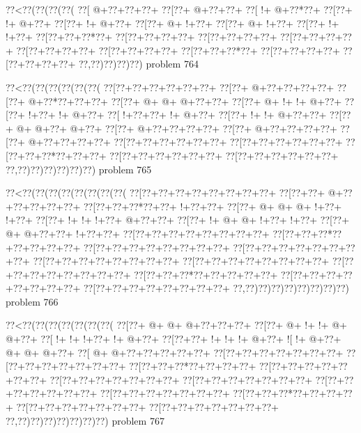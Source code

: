 \vbox{\vbox{\goo
\0??<\0??(\0??(\0??(\0??(
\0??[\- @+\0??+\0??+\0??+
\0??[\0??+\- @+\0??+\0??+
\0??[\- !+\- @+\0??*\0??+
\0??[\0??+\- !+\- @+\0??+
\0??[\0??+\- !+\- @+\0??+
\0??[\0??+\- @+\- !+\0??+
\0??[\0??+\- @+\- !+\0??+
\0??[\0??+\- !+\- !+\0??+
\0??[\0??+\0??+\0??*\0??+
\0??[\0??+\0??+\0??+\0??+
\0??[\0??+\0??+\0??+\0??+
\0??[\0??+\0??+\0??+\0??+
\0??[\0??+\0??+\0??+\0??+
\0??[\0??+\0??+\0??+\0??+
\0??[\0??+\0??+\0??*\0??+
\0??[\0??+\0??+\0??+\0??+
\0??[\0??+\0??+\0??+\0??+
\0??,\0??)\0??)\0??)\0??)
}
\hfil problem 764\hfil\break
}

\vbox{\vbox{\goo
\0??<\0??(\0??(\0??(\0??(\0??(\0??(
\0??[\0??+\0??+\0??+\0??+\0??+\0??+
\0??[\0??+\- @+\0??+\0??+\0??+\0??+
\0??[\0??+\- @+\0??*\0??+\0??+\0??+
\0??[\0??+\- @+\- @+\- @+\0??+\0??+
\0??[\0??+\- @+\- !+\- !+\- @+\0??+
\0??[\0??+\- !+\0??+\- !+\- @+\0??+
\0??[\- !+\0??+\0??+\- !+\- @+\0??+
\0??[\0??+\- !+\- !+\- @+\0??+\0??+
\0??[\0??+\- @+\- @+\0??+\- @+\0??+
\0??[\0??+\- @+\0??+\0??+\0??+\0??+
\0??[\0??+\- @+\0??+\0??+\0??+\0??+
\0??[\0??+\- @+\0??+\0??+\0??+\0??+
\0??[\0??+\0??+\0??+\0??+\0??+\0??+
\0??[\0??+\0??+\0??+\0??+\0??+\0??+
\0??[\0??+\0??+\0??*\0??+\0??+\0??+
\0??[\0??+\0??+\0??+\0??+\0??+\0??+
\0??[\0??+\0??+\0??+\0??+\0??+\0??+
\0??,\0??)\0??)\0??)\0??)\0??)\0??)
}
\hfil problem 765\hfil\break
}

\vbox{\vbox{\goo
\0??<\0??(\0??(\0??(\0??(\0??(\0??(\0??(\0??(
\0??[\0??+\0??+\0??+\0??+\0??+\0??+\0??+\0??+
\0??[\0??+\0??+\- @+\0??+\0??+\0??+\0??+\0??+
\0??[\0??+\0??+\0??*\0??+\0??+\- !+\0??+\0??+
\0??[\0??+\- @+\- @+\- @+\- !+\0??+\- !+\0??+
\0??[\0??+\- !+\- !+\- !+\0??+\- @+\0??+\0??+
\0??[\0??+\- !+\- @+\- @+\- !+\0??+\- !+\0??+
\0??[\0??+\- @+\- @+\0??+\0??+\- !+\0??+\0??+
\0??[\0??+\0??+\0??+\0??+\0??+\0??+\0??+\0??+
\0??[\0??+\0??+\0??*\0??+\0??+\0??+\0??+\0??+
\0??[\0??+\0??+\0??+\0??+\0??+\0??+\0??+\0??+
\0??[\0??+\0??+\0??+\0??+\0??+\0??+\0??+\0??+
\0??[\0??+\0??+\0??+\0??+\0??+\0??+\0??+\0??+
\0??[\0??+\0??+\0??+\0??+\0??+\0??+\0??+\0??+
\0??[\0??+\0??+\0??+\0??+\0??+\0??+\0??+\0??+
\0??[\0??+\0??+\0??*\0??+\0??+\0??+\0??+\0??+
\0??[\0??+\0??+\0??+\0??+\0??+\0??+\0??+\0??+
\0??[\0??+\0??+\0??+\0??+\0??+\0??+\0??+\0??+
\0??,\0??)\0??)\0??)\0??)\0??)\0??)\0??)\0??)
}
\hfil problem 766\hfil\break
}

\vbox{\vbox{\goo
\0??<\0??(\0??(\0??(\0??(\0??(\0??(\0??(
\0??[\0??+\- @+\- @+\- @+\0??+\0??+\0??+
\0??[\0??+\- @+\- !+\- !+\- @+\- @+\0??+
\0??[\- !+\- !+\- !+\0??+\- !+\- @+\0??+
\0??[\0??+\0??+\- !+\- !+\- !+\- @+\0??+
\- ![\- !+\- @+\0??+\- @+\- @+\- @+\0??+
\0??[\- @+\- @+\0??+\0??+\0??+\0??+\0??+
\0??[\0??+\0??+\0??+\0??+\0??+\0??+\0??+
\0??[\0??+\0??+\0??+\0??+\0??+\0??+\0??+
\0??[\0??+\0??+\0??*\0??+\0??+\0??+\0??+
\0??[\0??+\0??+\0??+\0??+\0??+\0??+\0??+
\0??[\0??+\0??+\0??+\0??+\0??+\0??+\0??+
\0??[\0??+\0??+\0??+\0??+\0??+\0??+\0??+
\0??[\0??+\0??+\0??+\0??+\0??+\0??+\0??+
\0??[\0??+\0??+\0??+\0??+\0??+\0??+\0??+
\0??[\0??+\0??+\0??*\0??+\0??+\0??+\0??+
\0??[\0??+\0??+\0??+\0??+\0??+\0??+\0??+
\0??[\0??+\0??+\0??+\0??+\0??+\0??+\0??+
\0??,\0??)\0??)\0??)\0??)\0??)\0??)\0??)
}
\hfil problem 767\hfil\break
}

